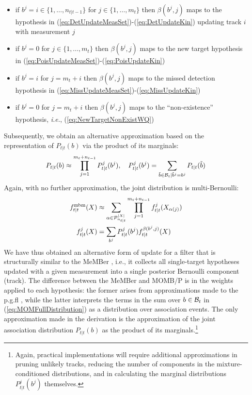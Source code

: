 \documentclass[journal,twoside]{IEEEtran}
\theoremstyle{plain}
\begin{document}
%
\begin{itemize}
\item if $b^j=i\in\{1,\dots,n_{t|t-1}\}$ for $j\in\{1,\dots,m_t\}$ then $\beta(b^j,j)$ maps to the hypothesis in (\ref{eq:DetUpdateMeasSet})-(\ref{eq:DetUpdateKin}) updating track $i$ with measurement $j$
\item if $b^j=0$ for $j\in\{1,\dots,m_t\}$ then $\beta(b^j,j)$ maps to the new target hypothesis in (\ref{eq:PoisUpdateMeasSet})-(\ref{eq:PoisUpdateKin})
\item if $b^j=i$ for $j=m_t+i$ then $\beta(b^j,j)$ maps to the missed detection hypothesis in (\ref{eq:MissUpdateMeasSet})-(\ref{eq:MissUpdateKin})
\item if $b^j=0$ for $j=m_t+i$ then $\beta(b^j,j)$ maps to the ``non-existence'' hypothesis, \textit{i.e.}\xspace, (\ref{eq:NewTargetNonExistWQ})
\end{itemize}
%
Subsequently, we obtain an alternative approximation based on the representation of $P_{t|t}(b)$ via the product of its marginals:
%
\begin{equation}\label{eq:MOApprox}
P_{t|t}(b) \approx \prod_{j=1}^{m_t+n_{t-1}}P_{t|t}^j(b^j), \quad P_{t|t}^j(b^j) = \sum_{\tilde{b}\in{\cal B}_t|\tilde{b}^j=b^j}P_{t|t}(\tilde{b})
\end{equation}
%
Again, with no further approximation, the joint distribution is multi-Bernoulli:
%
\begin{equation}
\begin{split}
f^\mathrm{mbm}_{t|t}(X) &\approx \sum_{\alpha\in{\cal P}_{n_{t|t}}^{|X|}}\prod_{j=1}^{m_t+n_{t-1}}
f_{t|t}^j(X_{\alpha(j)}) \\
f_{t|t}^j(X) &= \sum_{b^j}P_{t|t}^j(b^j)
f_{t|t}^{\beta(b^j,j)}(X)
\end{split}
\label{eq:MeMBer}
\end{equation}
%
We have thus obtained an alternative form of update for a filter that is structurally similar to the MeMBer \cite{Mah07,VoVo09}, i.e., it collects all single-target hypotheses updated with a given measurement into a single posterior Bernoulli component (track). The difference between the MeMBer and MOMB/P is in the weights applied to each hypothesis: the former arises from approximations made to the p.g.fl \cite[p668]{Mah07}, while the latter interprets the terms in the sum over $b\in{\cal B}_t$ in (\ref{eq:MOMFullDistribution}) as a distribution over association events. The only approximation made in the derivation is the approximation of the joint association distribution $P_{t|t}(b)$ as the product of its marginals.\footnote{Again, practical implementations will require additional approximations in pruning unlikely tracks, reducing the number of components in the mixture-conditioned distributions, and in calculating the marginal distributions $P_{t|t}^j(b^j)$ themselves.}
\end{document}
